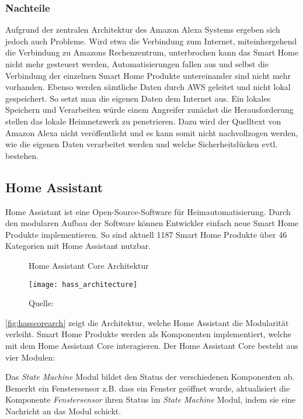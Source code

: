 \subsubsection{Nachteile}

Aufgrund der zentralen Architektur des Amazon Alexa Systems ergeben sich jedoch auch Probleme.
Wird etwa die Verbindung zum Internet, miteinhergehend die Verbindung zu Amazons Rechenzentrum, unterbrochen kann das Smart Home nicht mehr gesteuert werden, Automatisierungen fallen aus und selbst die Verbindung der einzelnen Smart Home Produkte untereinander sind nicht mehr vorhanden.
Ebenso werden sämtliche Daten durch \ac{AWS} geleitet und nicht lokal gespeichert.
So setzt man die eigenen Daten dem Internet aus.
Ein lokales Speichern und Verarbeiten würde einem Angreifer zunächst die Herausforderung stellen das lokale Heimnetzwerk zu penetrieren.
Dazu wird der Quelltext von Amazon Alexa nicht veröffentlicht und es kann somit nicht nachvollzogen werden, wie die eigenen Daten verarbeitet werden und welche Sicherheitslücken evtl. bestehen.

\subsection{Home Assistant}

Home Assistant ist eine Open-Source-Software für Heimautomatisierung.
Durch den modularen Aufbau der Software können Entwickler einfach neue Smart Home Produkte implementieren.
So sind aktuell 1187 Smart Home Produkte über 46 Kategorien mit Home Assistant nutzbar.

\begin{figure}[ht]
	\centering
	\caption{Home Assistant Core Architektur}
	\texttt{[image: hass\_architecture]}
	\caption*{\footnotesize{Quelle: }}
	\label{fig:hasscorearch}
\end{figure}

\autoref{fig:hasscorearch} zeigt die Architektur, welche Home Assistant die Modularität verleiht.
Smart Home Produkte werden als Komponenten implementiert, welche mit dem Home Assistant Core interagieren.
Der Home Assistant Core besteht aus vier Modulen:

Das \textit{State Machine} Modul bildet den Status der verschiedenen Komponenten ab.
Bemerkt ein Fenstersensor z.B. dass ein Fenster geöffnet wurde, aktualisiert die Komponente \textit{Fenstersensor} ihren Status im \textit{State Machine} Modul, indem sie eine Nachricht an das Modul schickt.

